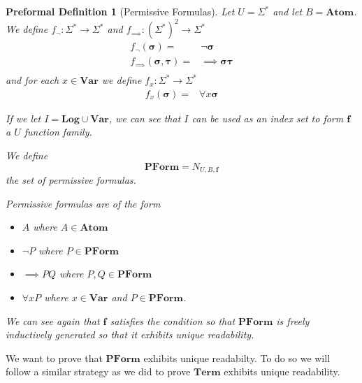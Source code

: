 \documentclass[oneside, 12pt]{book}
\theoremstyle{break}
\newtheorem{preformal definition}[definition]{Preformal Definition}
\newtheorem{preformal theorem}[theorem]{Preformal Theorem}
\newcommand{\bv}[1]{\boldsymbol{#1}}
\begin{document}
		\begin{preformal definition}[Permissive Formulas]
			Let $U = \Sigma^*$ and let $B = \textbf{Atom}$.
			We define $f_{\lnot}:\Sigma^* \to \Sigma^*$ and $f_{\implies}:(\Sigma^*)^2 \to \Sigma^*$
			\begin{align*}
				f_{\lnot}(\bv{\sigma}) =& \lnot \bv{\sigma}\\
				f_{\implies}(\bv{\sigma}, \bv{\tau}) =& \implies \bv{\sigma} \bv{\tau}\\
			\end{align*}
			and for each $x \in \textbf{Var}$ we define $f_x:\Sigma^* \to \Sigma^*$
			\begin{align*}
				f_x(\bv{\sigma}) =& \forall x \bv{\sigma}
			\end{align*}
			
			
			If we let $I = \textbf{Log}\cup \textbf{Var}$, we can see that $I$ can be used as an index set to form $\bv{f}$ a $U$ function family.
			
			We define
			\begin{equation*}
				\textbf{PForm} = N_{U, B, \bv{f}}
			\end{equation*}
			the set of permissive formulas.
			
			Permissive formulas are of the form 
			\begin{itemize}
				\item{$A$ where $A \in \textbf{Atom}$}
				\item{$\lnot P$ where $P \in \textbf{PForm}$}
				\item{$\implies PQ$ where $P, Q \in \textbf{PForm}$}
				\item{$\forall x P$ where $x\in \textbf{Var}$ and $P\in \textbf{PForm}$.}
			\end{itemize}
			
			We can see again that $\bv{f}$ satisfies the condition so that $\textbf{PForm}$ is freely inductively generated so that it exhibits unique readability.
		\end{preformal definition}
		
		We want to prove that $\textbf{PForm}$ exhibits unique readabilty.
		To do so we will follow a similar strategy as we did to prove $\textbf{Term}$ exhibits unique readability.
		
\end{document}
